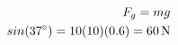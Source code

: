 \documentclass[preview]{standalone}
\begin{document}
\begin{align*}
\special{dvisvgm:raw <g id='unique000'>}F_g = m g \\sin(37^{\circ}) = 10(10)(0.6) = 60\,\mathrm{N}\special{dvisvgm:raw </g>}
\end{align*}
\end{document}
